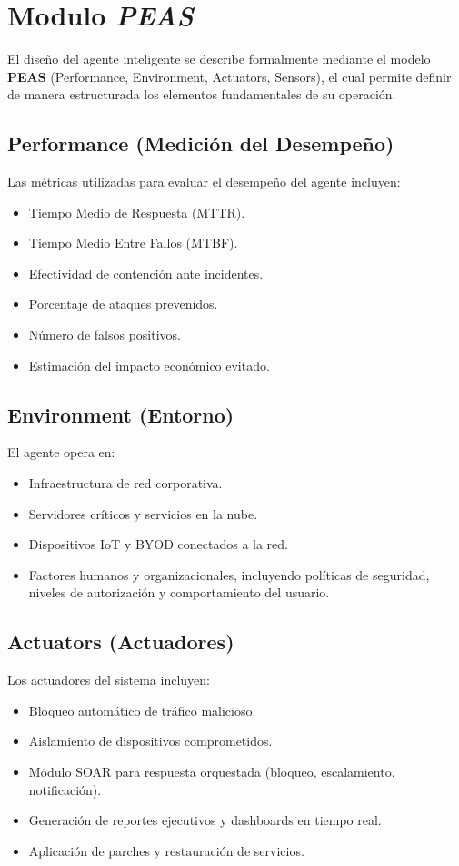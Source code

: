 \section{Modulo \textit{PEAS}}

El diseño del agente inteligente se describe formalmente mediante el modelo
\textbf{PEAS} (Performance, Environment, Actuators, Sensors), el cual permite
definir de manera estructurada los elementos fundamentales de su operación.

\subsection{Performance (Medición del Desempeño)}
Las métricas utilizadas para evaluar el desempeño del agente incluyen:
\begin{itemize}
    \item Tiempo Medio de Respuesta (MTTR).
    \item Tiempo Medio Entre Fallos (MTBF).
    \item Efectividad de contención ante incidentes.
    \item Porcentaje de ataques prevenidos.
    \item Número de falsos positivos.
    \item Estimación del impacto económico evitado.
\end{itemize}

\subsection{Environment (Entorno)}
El agente opera en:
\begin{itemize}
    \item Infraestructura de red corporativa.
    \item Servidores críticos y servicios en la nube.
    \item Dispositivos IoT y BYOD conectados a la red.
    \item Factores humanos y organizacionales, incluyendo políticas de seguridad, niveles
          de autorización y comportamiento del usuario.
\end{itemize}

\subsection{Actuators (Actuadores)}
Los actuadores del sistema incluyen:
\begin{itemize}
    \item Bloqueo automático de tráfico malicioso.
    \item Aislamiento de dispositivos comprometidos.
    \item Módulo SOAR para respuesta orquestada (bloqueo, escalamiento, notificación).
    \item Generación de reportes ejecutivos y dashboards en tiempo real.
    \item Aplicación de parches y restauración de servicios.
\end{itemize}

